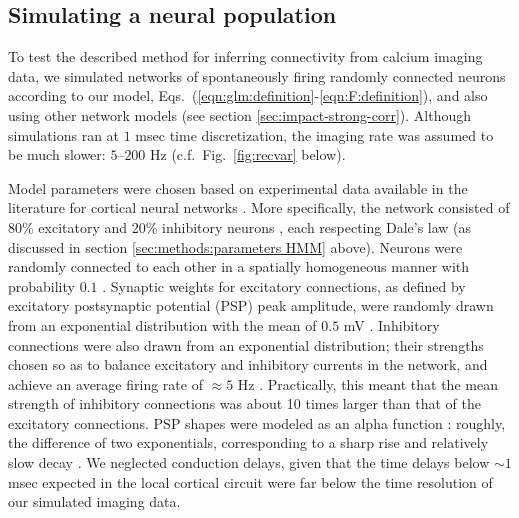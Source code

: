 \documentclass[aoas,preprint]{imsart}
\begin{document}
\subsection{Simulating a neural population} \label{sec:results:simulations}

To test the described method for inferring connectivity from calcium
imaging data, we simulated networks of spontaneously firing randomly
connected neurons according to our model,
Eqs.~(\ref{eqn:glm:definition}-\ref{eqn:F:definition}), and also
using other network models (see section \ref{sec:impact-strong-corr}).
Although simulations ran at $1$ msec time discretization, the imaging
rate was assumed to be much slower: $5$--$200$ Hz
(c.f.~Fig.~\ref{fig:recvar} below).

Model parameters were chosen based on experimental data available in
the literature for cortical neural networks
\cite{Sayer1990,Braitenberg1998,Urquijo2000,Lefort2009}. More
specifically, the network consisted of 80\% excitatory and 20\%
inhibitory neurons \cite{Braitenberg1998,Urquijo2000}, each respecting
Dale's law (as discussed in section \ref{sec:methods:parameters HMM}
above). Neurons were randomly connected to each other in a spatially
homogeneous manner with probability $0.1$
\cite{Braitenberg1998,Lefort2009}. Synaptic weights for excitatory
connections, as defined by excitatory postsynaptic potential (PSP)
peak amplitude, were randomly drawn from an exponential distribution
with the mean of $0.5$ mV \cite{Lefort2009,Sayer1990}. Inhibitory
connections were also drawn from an exponential distribution; their
strengths chosen so as to balance excitatory and inhibitory currents
in the network, and achieve an average firing rate of $\approx 5 $ Hz
\cite{Abeles91}. Practically, this meant that the mean strength of
inhibitory connections was about 10 times larger than that of the
excitatory connections. PSP shapes were modeled as an alpha function
\cite{Koch99}: roughly, the difference of two exponentials,
corresponding to a sharp rise and relatively slow decay
\cite{Sayer1990}. We neglected conduction delays, given that the time
delays below $\sim 1$ msec expected in the local cortical circuit were
far below the time resolution of our simulated imaging data.
\end{document}
